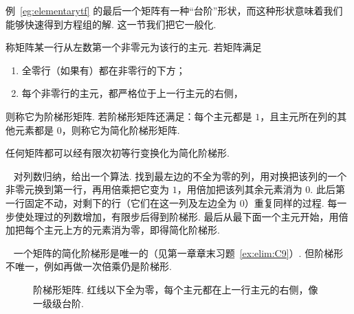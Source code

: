 \documentclass[lang=cn,10.5pt,scheme=chinese,toc=twocol,section,chinesefont=nofont,
twoside,citestyle=gb7714-2015,bibstyle=gb7714-2015]{elegantbook}
\DeclareRobustCommand{\textbf}[1]{{\lnsemiboldlatin\lnsemiboldcjk #1}}
\numberwithin{equation}{section}   %
\newcommand*{\lnlabel}[1]{{\sffamily\bfseries\color{black}#1}}
\renewenvironment{proof}{%
	\par\noindent\lnlabel{\proofname}\;\ \color{black!90}\cfs}{\par}
\renewenvironment{remark}{\noindent\lnlabel{\remarkname}\ }{\par}
\begin{document}
例~\ref{eg:elementarytf} 的最后一个矩阵有一种“台阶”形状，而这种形状意味着我们能够快速得到方程组的解. 这一节我们把它一般化.

\begin{definition}
  称矩阵某一行从左数第一个非零元为该行的\textbf{主元}. 若矩阵满足
  \begin{enumerate}
    \item 全零行（如果有）都在非零行的下方；
    \item 每个非零行的主元，都严格位于上一行主元的右侧，
  \end{enumerate}
  则称它为\textbf{阶梯形矩阵}. 若阶梯形矩阵还满足：每个主元都是 $1$，且主元所在列的其他元素都是 $0$，则称它为\textbf{简化阶梯形矩阵}.
\end{definition}

\begin{theorem}
  \label{thm:rref}
  任何矩阵都可以经有限次初等行变换化为简化阶梯形.
\end{theorem}

\begin{proof}
  对列数归纳，给出一个算法. 找到最左边的不全为零的列，用对换把该列的一个非零元换到第一行，再用倍乘把它变为 $1$，用倍加把该列其余元素消为 $0$. 此后第一行固定不动，对剩下的行（它们在这一列及左边全为 $0$）重复同样的过程. 每一步使处理过的列数增加，有限步后得到阶梯形. 最后从最下面一个主元开始，用倍加把每个主元上方的元素消为零，即得简化阶梯形.
\end{proof}

\begin{remark}
  一个矩阵的简化阶梯形是唯一的（见第一章章末习题~\ref{ex:elim:C9}）. 但阶梯形不唯一，例如再做一次倍乘仍是阶梯形.
\end{remark}
\begin{figure}[htbp]
  \centering
  \caption{阶梯形矩阵. 红线以下全为零，每个主元都在上一行主元的右侧，像一级级台阶.}
  \label{fig:echelon}
\end{figure}
\end{document}
